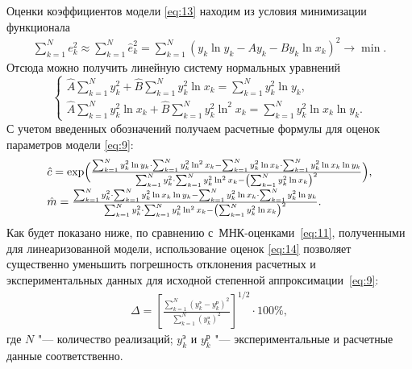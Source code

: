 Оценки коэффициентов модели \eqref{eq:13} находим из условия минимизации функционала
\begin{gather*}
	\sum  _{k=1}^{N} e^2_k \approx \sum  _{k=1}^{N} \hat{e}^2_k = \sum  _{k=1}^{N} (y_k \ln y_k - A y_k - B y_k \ln x_k)^2 \rightarrow \min.
\end{gather*}
Отсюда можно получить линейную систему нормальных уравнений
\begin{equation*} 
 \begin{cases}
   \hat{A} \sum  _{k=1}^{N} y^2_k + \hat{B} \sum  _{k=1}^{N} y^2_k \ln x_k = \sum  _{k=1}^{N} y^2_k \ln y_k,	\\
   \hat{A} \sum  _{k=1}^{N} y^2_k \ln x_k + \hat{B} \sum  _{k=1}^{N} y^2_k \ln^2 x_k = \sum  _{k=1}^{N} y^2_k \ln x_k \ln y_k.
 \end{cases}
\end{equation*}
С учетом введенных обозначений получаем расчетные формулы для оценок параметров модели \eqref{eq:9}:
\begin{align} \label{eq:14}
\begin{array}{l} 
	\hat{c} = \exp \Bigl(\frac{\sum  _{k=1}^{N} y_k^2 \ln y_k \cdot \sum  _{k=1}^{N} y_k^2 \ln^2 x_k - \sum  _{k=1}^{N} y_k^2 \ln x_k \cdot \sum  _{k=1}^{N} y_k^2 \ln x_k \ln y_k} {\sum  _{k=1}^{N} y_k^2 \cdot \sum  _{k=1}^{N} y_k^2 \ln^2 x_k - \left(\sum  _{k=1}^{N} y_k^2 \ln x_k \right)^2}\Bigr),	\\[3mm]
	\hat{m} = \frac{\sum  _{k=1}^{N} y_k^2  \cdot \sum  _{k=1}^{N} y_k^2 \ln x_k \ln y_k - \sum  _{k=1}^{N} y_k^2 \ln x_k \cdot \sum  _{k=1}^{N} y_k^2 \ln y_k} {\sum  _{k=1}^{N} y_k^2 \cdot \sum  _{k=1}^{N} y_k^2 \ln^2 x_k - \left(\sum  _{k=1}^{N} y_k^2 \ln x_k \right)^2}.
	\end{array}
\end{align} 
Как будет показано ниже, по сравнению с~МНК-оценками~\eqref{eq:11}, полученными для линеаризованной модели, использование оценок \eqref{eq:14} позволяет существенно уменьшить погрешность отклонения расчетных и экспериментальных данных для исходной степенной аппроксимации~\eqref{eq:9}:
\begin{gather} \label{eq:141}
	\displaystyle \Delta = \left[\frac{\sum_{k=1}^N \left( y_{k}^\text{э} - y_{k}^\text{р} \right)^2}{\sum_{k=1}^N \left( y_{k}^\text{э} \right)^2} \right]^{1/2} \cdot 100 \%,
\end{gather}
где $N$ "--- количество реализаций; $y_{k}^{\text{э}}$ и $y_{k}^{\text{р}}$ "--- экспериментальные и расчетные данные соответственно.


